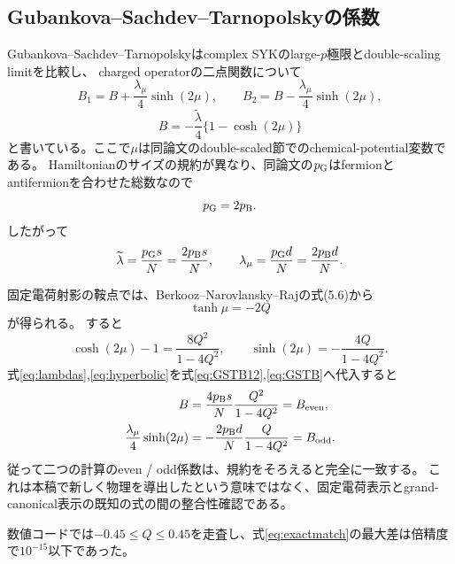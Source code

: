\documentclass[a4paper,11pt]{ltjsarticle}
\numberwithin{equation}{section}
\begin{document}
\subsection{Gubankova--Sachdev--Tarnopolskyの係数}
Gubankova--Sachdev--Tarnopolskyはcomplex SYKのlarge-$p$極限とdouble-scaling limitを比較し、
charged operatorの二点関数について\cite{GST}
\begin{equation}
 B_1=B+\frac{\lambda_\mu}{4}\sinh(2\mu),\qquad
 B_2=B-\frac{\lambda_\mu}{4}\sinh(2\mu),
 \label{eq:GSTB12}
\end{equation}
\begin{equation}
 B=-\frac{\widetilde\lambda}{4}\{1-\cosh(2\mu)\}
 \label{eq:GSTB}
\end{equation}
と書いている。ここで$\mu$は同論文のdouble-scaled節でのchemical-potential変数である。
Hamiltonianのサイズの規約が異なり、同論文の$p_{\rm G}$はfermionとantifermionを合わせた総数なので
\begin{equation}
 p_{\rm G}=2p_{\rm B}.
 \label{eq:pmap}
\end{equation}
したがって
\begin{equation}
 \widetilde\lambda=\frac{p_{\rm G}s}{N}=\frac{2p_{\rm B}s}{N},\qquad
 \lambda_\mu=\frac{p_{\rm G}d}{N}=\frac{2p_{\rm B}d}{N}.
 \label{eq:lambdas}
\end{equation}

固定電荷射影の鞍点では、Berkooz--Narovlansky--Rajの式(5.6)から
\begin{equation}
 \tanh\mu=-2Q
 \label{eq:mumap}
\end{equation}
が得られる。
すると
\begin{equation}
 \cosh(2\mu)-1=\frac{8Q^2}{1-4Q^2},\qquad
 \sinh(2\mu)=-\frac{4Q}{1-4Q^2}.
 \label{eq:hyperbolic}
\end{equation}
式\eqref{eq:lambdas},\eqref{eq:hyperbolic}を式\eqref{eq:GSTB12},\eqref{eq:GSTB}へ代入すると
\begin{align}
 B&=\frac{4p_{\rm B}s}{N}\frac{Q^2}{1-4Q^2}=B_{\rm even},\\
 \frac{\lambda_\mu}{4}\sinh(2\mu)
 &=-\frac{2p_{\rm B}d}{N}\frac{Q}{1-4Q^2}=B_{\rm odd}.
 \label{eq:exactmatch}
\end{align}
従って二つの計算のeven / odd係数は、規約をそろえると完全に一致する。
これは本稿で新しく物理を導出したという意味ではなく、固定電荷表示とgrand-canonical表示の既知の式の間の整合性確認である。

数値コードでは$-0.45\leq Q\leq0.45$を走査し、式\eqref{eq:exactmatch}の最大差は倍精度で$10^{-15}$以下であった。
\end{document}
